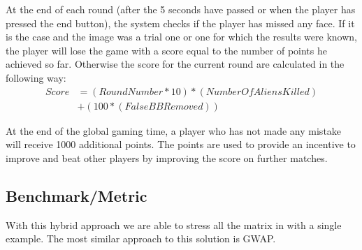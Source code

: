 At the end of each round (after the 5 seconds have passed or when the player has
pressed the end button), the system checks if the player has missed any face. If
it is the case and the image was a trial one or one for which the results were
known, the player will lose the game with a score equal to the number of points
he achieved so far. Otherwise the score for the current round are calculated in
the following way:
\begin{equation}
\begin{split}
    Score &= (RoundNumber*10)*(NumberOfAliensKilled)\\
          &+(100*(FalseBBRemoved))
\end{split}
\end{equation}

At the end of the global gaming time, a player who has not made any mistake will
receive 1000 additional points. The points are used to provide an incentive to
improve and beat other players by improving the score on further matches.


\subsection{Benchmark/Metric}
With this hybrid approach we are able to stress all the matrix in with a single
example. The most similar approach to this solution is \ac{GWAP}.

